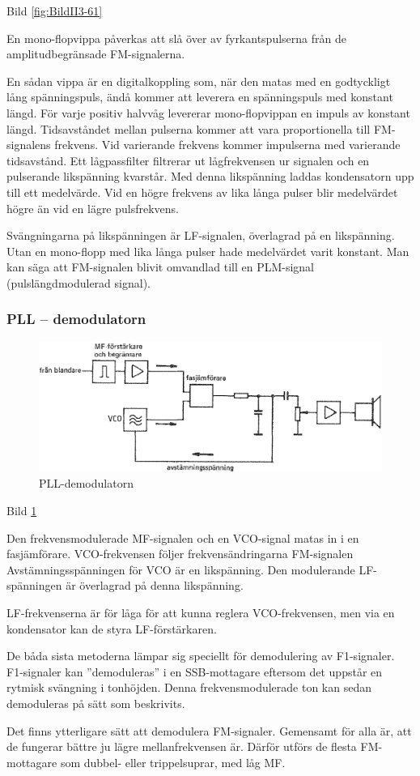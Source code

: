 Bild \ref{fig:BildII3-61}

En mono-flopvippa påverkas att slå över av fyrkantspulserna från de
amplitudbegränsade FM-signalerna.

En sådan vippa är en digitalkoppling som, när den matas med en
godtyckligt lång spänningspuls, ändå kommer att leverera en
spänningspuls med konstant längd. För varje positiv halvvåg levererar
mono-flopvippan en impuls av konstant längd. Tidsavståndet mellan
pulserna kommer att vara proportionella till FM-signalens
frekvens. Vid varierande frekvens kommer impulserna med varierande
tidsavstånd. Ett lågpassfilter filtrerar ut lågfrekvensen ur signalen
och en pulserande likspänning kvarstår. Med denna likspänning laddas
kondensatorn upp till ett medelvärde. Vid en högre frekvens av lika
långa pulser blir medelvärdet högre än vid en lägre pulsfrekvens.

Svängningarna på likspänningen är LF-signalen, överlagrad på en
likspänning. Utan en mono-flopp med lika långa pulser hade medelvärdet
varit konstant. Man kan säga att FM-signalen blivit omvandlad till en
PLM-signal (pulslängdmodulerad signal).

\subsubsection{PLL -- demodulatorn}

\begin{figure}
\includegraphics[width=\textwidth]{images/cropped_pdfs/bild_2_3-62.pdf}
\caption{PLL-demodulatorn}
\label{fig:BildII3-62}
\end{figure}

Bild \ref{fig:BildII3-62}

Den frekvensmodulerade MF-signalen och en VCO-signal matas in i en
fasjämförare. VCO-frekvensen följer frekvensändringarna FM-signalen
Avstämningsspänningen för VCO är en likspänning. Den modulerande
LF-spänningen är överlagrad på denna likspänning.

LF-frekvenserna är för låga för att kunna reglera VCO-frekvensen, men
via en kondensator kan de styra LF-förstärkaren.

De båda sista metoderna lämpar sig speciellt för demodulering av
F1-signaler. F1-signaler kan ''demoduleras'' i en SSB-mottagare eftersom
det uppstår en rytmisk svängning i tonhöjden. Denna frekvensmodulerade
ton kan sedan demoduleras på sätt som beskrivits.

Det finns ytterligare sätt att demodulera FM-signaler. Gemensamt för
alla är, att de fungerar bättre ju lägre mellanfrekvensen är.  Därför
utförs de flesta FM-mottagare som dubbel- eller trippelsuprar, med låg
MF.
